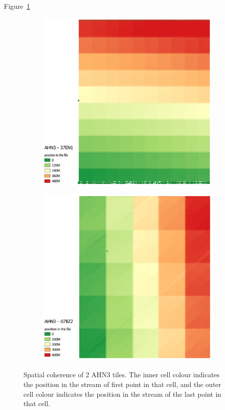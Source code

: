 Figure~\ref{fig:spatial_coherence_examples}
\begin{figure}
  \centering
  \begin{subfigure}[b]{0.45\linewidth}
    \centering
    \includegraphics[width=\textwidth]{figs/37EN1_double}
    \caption{}
  \end{subfigure}%
  \qquad
  \begin{subfigure}[b]{0.45\linewidth}
    \centering
    \includegraphics[width=\textwidth]{figs/07BZ2-double}
    \caption{}
  \end{subfigure}
\caption{Spatial coherence of 2 AHN3 tiles. The inner cell colour indicates the position in the stream of first point in that cell, and the outer cell colour indicates the position in the stream of the last point in that cell.}%
\label{fig:spatial_coherence_examples}
\end{figure}
